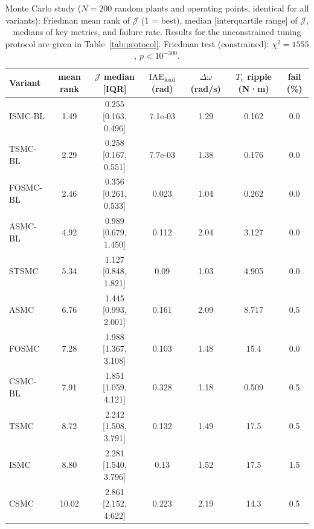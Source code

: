 \begin{table}[!t]
\centering
\caption{Monte Carlo study ($N=200$ random plants and operating points, identical for all variants): Friedman mean rank of $\mathcal J$ (1 = best), median [interquartile range] of $\mathcal J$, medians of key metrics, and failure rate. Results for the unconstrained tuning protocol are given in Table~\ref{tab:protocol}. Friedman test (constrained): $\chi^2=1555$, $p<10^{-300}$.}
\label{tab:mc}
\small
\begin{tabular}{@{}lcccccc@{}}
\toprule
\textbf{Variant} & \textbf{mean rank} & $\mathcal J$ median [IQR] & $\mathrm{IAE}_{\text{load}}$ (rad) & $\Delta\omega$ (rad/s) & $T_e$ ripple (N·m) & fail (\%) \\
\midrule
ISMC-BL & 1.49 & 0.255 [0.163, 0.496] & 7.1e-03 & 1.29 & 0.162 & 0.0 \\
TSMC-BL & 2.29 & 0.258 [0.167, 0.551] & 7.7e-03 & 1.38 & 0.176 & 0.0 \\
FOSMC-BL & 2.46 & 0.356 [0.261, 0.533] & 0.023 & 1.04 & 0.262 & 0.0 \\
ASMC-BL & 4.92 & 0.989 [0.679, 1.450] & 0.112 & 2.04 & 3.127 & 0.0 \\
STSMC & 5.34 & 1.127 [0.848, 1.821] & 0.09 & 1.03 & 4.905 & 0.0 \\
ASMC & 6.76 & 1.445 [0.993, 2.001] & 0.161 & 2.09 & 8.717 & 0.5 \\
FOSMC & 7.28 & 1.988 [1.367, 3.108] & 0.103 & 1.48 & 15.4 & 0.0 \\
CSMC-BL & 7.91 & 1.851 [1.059, 4.121] & 0.328 & 1.18 & 0.509 & 0.5 \\
TSMC & 8.72 & 2.242 [1.508, 3.791] & 0.132 & 1.49 & 17.5 & 0.5 \\
ISMC & 8.80 & 2.281 [1.540, 3.796] & 0.13 & 1.52 & 17.5 & 1.5 \\
CSMC & 10.02 & 2.861 [2.152, 4.622] & 0.223 & 2.19 & 14.3 & 0.5 \\
\bottomrule
\end{tabular}
\end{table}
